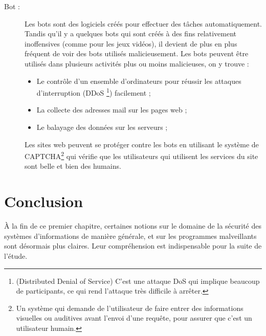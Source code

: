 \begin{description}
        \item[Bot :] Les bots sont des logiciels créés pour effectuer des tâches automatiquement. 
            Tandis qu’il y a quelques bots qui sont créés à des fins relativement inoffensives 
            (comme pour les jeux vidéos), il devient de plus en plus fréquent de voir des bots utilisés malicieusement. 
            Les bots peuvent être utilisés dans plusieurs activités plus ou moins malicieuses, on y trouve :
            \begin{itemize}
                \item Le contrôle d'un ensemble d’ordinateurs pour réussir les attaques d’interruption (DDoS
                    \footnote{(Distributed Denial of Service) C'est une attaque DoS qui implique beaucoup de
                    participants, ce qui rend l'attaque très difficile à arrêter.}) facilement ;
                \item La collecte des adresses mail sur les pages web ;
                \item Le balayage des données sur les serveurs ;
            \end{itemize}
            Les sites web peuvent se protéger contre les bots en utilisant le système de 
            CAPTCHA\footnote{Un système qui demande de l'utilisateur de faire entrer des informations visuelles ou
            auditives avant l'envoi d'une requête, pour assurer que c'est un utilisateur humain.} qui vérifie que 
            les utilisateurs qui utilisent les services du site sont belle et bien des humains. 
            \cite{malware_types} %
    \end{description}


\section{Conclusion}
À la fin de ce premier chapitre, certaines notions sur le domaine de la sécurité des systèmes 
d’informations de manière générale, et sur les programmes malveillants sont désormais plus claires. 
Leur compréhension est indispensable pour la suite de l’étude. 
